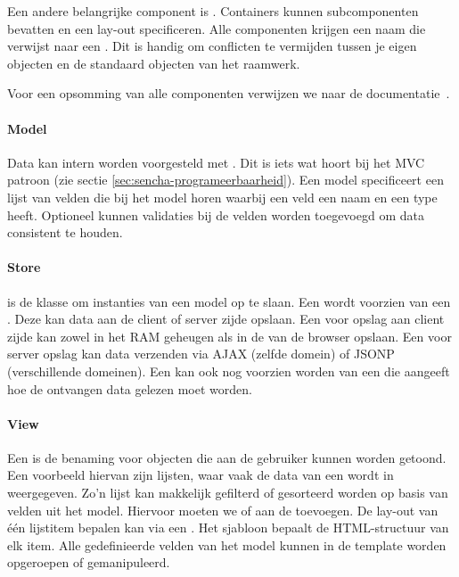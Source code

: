 Een andere belangrijke component is .  
Containers kunnen subcomponenten bevatten en een lay-out specificeren.  
Alle componenten krijgen een naam die verwijst naar een .  
Dit is handig om conflicten te vermijden tussen je eigen objecten en de standaard objecten van het raamwerk.  

Voor een opsomming van alle componenten verwijzen we naar de documentatie~\cite{Inc.2013a}.


\paragraph{Model}
Data kan intern worden voorgesteld met .  
Dit is iets wat hoort bij het MVC patroon (zie sectie \ref{sec:sencha-programeerbaarheid}).  
Een model specificeert een lijst van velden die bij het model horen waarbij een veld een naam en een type heeft.  
Optioneel kunnen validaties bij de velden worden toegevoegd om data consistent te houden.  

\paragraph{Store}
 is de klasse om instanties van een model op te slaan.  
Een  wordt voorzien van een .  
Deze kan data aan de client of server zijde opslaan.  
Een  voor opslag aan client zijde kan zowel in het RAM geheugen als in de  van de browser opslaan.  
Een  voor server opslag kan data verzenden via AJAX (zelfde domein) of JSONP (verschillende domeinen).  
Een  kan ook nog voorzien worden van een  die aangeeft hoe de ontvangen data gelezen moet worden.

\paragraph{View}
Een  is de benaming voor objecten die aan de gebruiker kunnen worden getoond.  
Een voorbeeld hiervan zijn lijsten,  waar vaak de data van een  wordt in weergegeven.  
Zo'n lijst kan makkelijk gefilterd of gesorteerd worden op basis van velden uit het model.  
Hiervoor moeten we  of  aan de  toevoegen. 
De lay-out van één lijstitem bepalen kan via een .  
Het sjabloon bepaalt de HTML-structuur van elk item.  
Alle gedefinieerde velden van het model kunnen in de template worden opgeroepen of gemanipuleerd.

